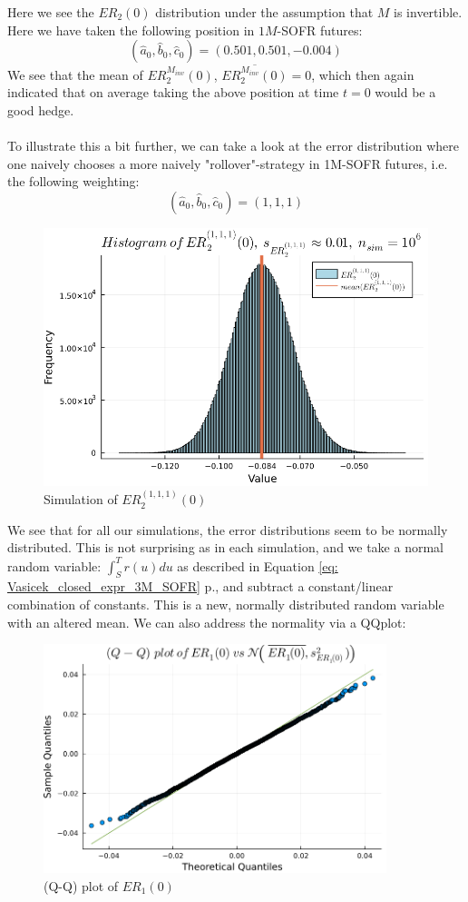 Here we see the $ER_{2}(0)$ distribution under the assumption that $M$ is invertible. Here we have taken the following position in $1M$-SOFR futures: 
\[
(\hat{a}_{0}, \hat{b}_{0}, \hat{c}_{0})
= 
(0.501, 0.501, -0.004)
\]
We see that the mean of $ER_{2}^{M_{inv}}(0)$, $\overline{ER_{2}^{M_{inv}}(0)} = 0$, which then again indicated that on average taking the above position at time $t=0$ would be a good hedge. 
\\~\\ 
To illustrate this a bit further, we can take a look at the error distribution where one naively chooses a more naively "rollover"-strategy in 1M-SOFR futures, i.e. the following weighting:  
\[
(\hat{a}_{0}, \hat{b}_{0}, \hat{c}_{0})
= 
(1, 1, 1)
\]

\begin{figure}[htp]
    \centering
    \includegraphics[width=12cm]{figures/SOFR/ER_2(0)_111.PNG}
    \caption{Simulation of $ER_{2}^{(1,1,1)}(0)$}
    \label{fig: ER_2_(0)_111}
\end{figure}

We see that for all our simulations, the error distributions seem to be normally distributed. This is not surprising as in each simulation, and we take a normal random variable: $\int_{S}^{T}r(u)du$ as described in  Equation \ref{eq: Vasicek_closed_expr_3M_SOFR} p.\pageref{eq: Vasicek_closed_expr_3M_SOFR}, and subtract a constant/linear combination of constants. This is a new, normally distributed random variable with an altered mean. 
We can also address the normality via a QQplot:


\begin{figure}[htp]
    \centering
    \includegraphics[width=10cm]{figures/SOFR/QQ_plot_ER_1(0).PNG}
    \caption{(Q-Q) plot of $ER_{1}(0)$}
    \label{fig: ER_1(0)_QQ_plt}
\end{figure}